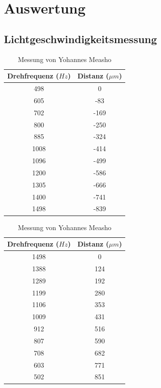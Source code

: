 \section{Auswertung}

\subsection{Lichtgeschwindigkeitsmessung}

\begin{table}[H]
    \caption{Distanzmessungen bei Inkrementieren und Dekrementieren der Drehfrequenz}
    \begin{subtable}{.5\linewidth}
        \centering
        \caption{Messung von Alex Murray}
        \label{tab:am-f-x}
        \begin{tabular}{cc}
            \toprule
            Drehfrequenz ($Hz$) & Distanz ($\mu m$) \\
            \midrule
            498  & 0    \\
            605  & -83  \\
            702  & -169 \\
            800  & -250 \\
            885  & -324 \\
            1008 & -414 \\
            1096 & -499 \\
            1200 & -586 \\
            1305 & -666 \\
            1400 & -741 \\
            1498 & -839 \\
            \bottomrule
        \end{tabular}
    \end{subtable}
    \begin{subtable}{.5\linewidth}
        \centering
        \caption{Messung von Yohannes Measho}
        \label{tab:ym-f-x}
        \begin{tabular}{cc}
            \toprule
            Drehfrequenz ($Hz$) & Distanz ($\mu m$) \\
            \midrule
            1498 & 0   \\
            1388 & 124 \\
            1289 & 192 \\
            1199 & 280 \\
            1106 & 353 \\
            1009 & 431 \\
            912  & 516 \\
            807  & 590 \\
            708  & 682 \\
            603  & 771 \\
            502  & 851 \\
            \bottomrule
        \end{tabular}
    \end{subtable}
\end{table}

